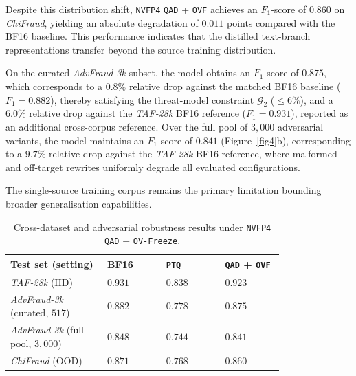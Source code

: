 \documentclass[a4paper,fleqn]{cas-sc}
\begin{document}
Despite this distribution shift, \texttt{NVFP4} \texttt{QAD} + \texttt{OVF} achieves an $F_1$-score of $0.860$ on \textit{ChiFraud}, yielding an absolute degradation of $0.011$ points compared with the BF16 baseline. This performance indicates that the distilled text-branch representations transfer beyond the source training distribution.

On the curated \textit{AdvFraud-3k} subset, the model obtains an $F_1$-score of $0.875$, which corresponds to a $0.8\%$ relative drop against the matched BF16 baseline ($F_1 = 0.882$), thereby satisfying the threat-model constraint $\mathcal{G}_2$ ($\le 6\%$), and a $6.0\%$ relative drop against the \textit{TAF-28k} BF16 reference ($F_1 = 0.931$), reported as an additional cross-corpus reference. Over the full pool of $3{,}000$ adversarial variants, the model maintains an $F_1$-score of $0.841$ (Figure~\ref{fig4}b), corresponding to a $9.7\%$ relative drop against the \textit{TAF-28k} BF16 reference, where malformed and off-target rewrites uniformly degrade all evaluated configurations.

The single-source training corpus remains the primary limitation bounding broader generalisation capabilities.

\begin{table}[!t]
\centering
\caption{Cross-dataset and adversarial robustness results under \texttt{NVFP4} \texttt{QAD} + \texttt{OV-Freeze}.}
\label{tab4-cross-en}
\small
\renewcommand{\arraystretch}{1.1}
\begin{tabular}{>{\centering\arraybackslash}p{0.28\linewidth}>{\centering\arraybackslash}p{0.17\linewidth}>{\centering\arraybackslash}p{0.17\linewidth}>{\centering\arraybackslash}p{0.17\linewidth}}
\toprule
\textbf{Test set (setting)} & \textbf{BF16} & \textbf{\texttt{PTQ}} & \textbf{\texttt{QAD} + \texttt{OVF}} \\
\midrule
\textit{TAF-28k} (IID) & $0.931$ & $0.838$ & $\mathbf{0.923}$ \\
\textit{AdvFraud-3k} (curated, $517$) & $0.882$ & $0.778$ & $\mathbf{0.875}$ \\
\textit{AdvFraud-3k} (full pool, $3{,}000$) & $0.848$ & $0.744$ & $\mathbf{0.841}$ \\
\textit{ChiFraud} (OOD) & $0.871$ & $0.768$ & $\mathbf{0.860}$ \\
\bottomrule
\end{tabular}
\end{table}
\end{document}
